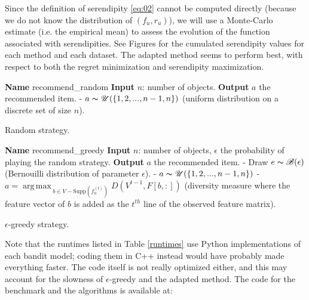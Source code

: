 \documentclass{article}
\DeclareMathOperator*{\argmax}{arg\,max\,}
\begin{document}
Since the definition of serendipity \ref{eq:02} cannot be computed directly (because we do not know the distribution of $(f_{u}, r_{u})$), we will use a Monte-Carlo estimate (i.e. the empirical mean) to assess the evolution of the function associated with serendipities. See Figures for the cumulated serendipity values for each method and each dataset. The adapted method seems to perform best, with respect to both the regret minimization and serendipity maximization.


\begin{algorithm}
\begin{algorithmic}
\STATE \textbf{Name} recommend\_random
\STATE \textbf{Input} $n$: number of objects.
\STATE \textbf{Output} $a$ the recommended item.
\STATE - $a \thicksim \mathscr{U}(\{1, 2, ..., n-1, n\})$ (uniform distribution on a discrete set of size $n$).
\end{algorithmic}
\caption{Random strategy.}
\label{random}
\end{algorithm}

\begin{algorithm}
\begin{algorithmic}
\STATE \textbf{Name} recommend\_greedy
\STATE \textbf{Input} $n$: number of objects, $\epsilon$ the probability of playing the random strategy.
\STATE \textbf{Output} $a$ the recommended item.
\STATE - Draw $e \thicksim \mathscr{B}(\epsilon)$ (Bernouilli distribution of parameter $\epsilon$).
\STATE - $a \thicksim \mathscr{U}(\{1, 2, ..., n-1, n\})$
\ELSE
\STATE - $a = \argmax_{b \in V-\text{Supp}(f^{(t)}_{u})} D(V^{t-1}, F[b, :])$ (diversity measure where the feature vector of $b$ is added as the $t^{th}$ line of the observed feature matrix).
\ENDIF
\end{algorithmic}
\caption{$\epsilon$-greedy strategy.}
\label{greedy}
\end{algorithm}

Note that the runtimes listed in Table \ref{runtimes} use Python implementations of each bandit model; coding them in C++ instead would have probably made everything faster. The code itself is not really optimized either, and this may account for the slowness of $\epsilon$-greedy and the adapted method. The code for the benchmark and the algorithms is available at:
\end{document}

